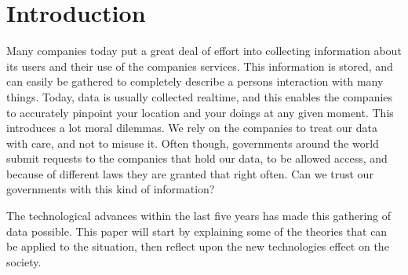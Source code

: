 \section{Introduction}
Many companies today put a great deal of effort into collecting information about its users and their use of the companies services. This information is stored, and can easily be gathered to completely describe a persons interaction with many things. Today, data is usually collected realtime, and this enables the companies to accurately pinpoint your location and your doings at any given moment. This introduces a lot moral dilemmas. We rely on the companies to treat our data with care, and not to misuse it. Often though, governments around the world submit requests to the companies that hold our data, to be allowed access, and because of different laws they are granted that right often. Can we trust our governments with this kind of information?

The technological advances within the last five years has made this gathering of data possible.
This paper will start by explaining some of the theories that can be applied to the situation, then reflect upon the new technologies effect on the society.
\newpage
